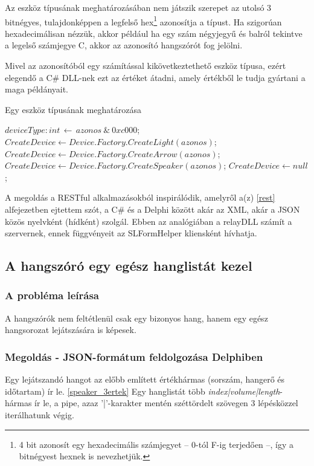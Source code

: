 \documentclass[tocnopagenum]{thesis-ekf}
\begin{document}
	Az eszköz típusának meghatározásában nem játszik szerepet az utolsó 3 bitnégyes, tulajdonképpen a legfelső hex\footnote{4 bit azonosít egy hexadecimális számjegyet -- 0-tól F-ig terjedően --, így a bitnégyest hexnek is nevezhetjük.} azonosítja a típust.
	Ha szigorúan hexadecimálisan nézzük, akkor például ha egy szám négyjegyű és balról tekintve a legelső számjegye C, akkor az azonosító hangszórót fog jelölni.
	
	Mivel az azonosítóból egy számítással kikövetkeztethető eszköz típusa, ezért elegendő a C\# DLL-nek ezt az értéket átadni, amely értékből le tudja gyártani a maga példányait.
	
	\begin{algorithm}
		\caption{Egy eszköz típusának meghatározása}
		\label{algo:createdevice}
		\begin{algorithmic}[0]
			\State $deviceType:int\,\gets\,azonos\ \mathbin{\&}\ 0xc000$; 
				\State $CreateDevice \gets Device.Factory.CreateLight(azonos)$;
				\State $CreateDevice \gets Device.Factory.CreateArrow(azonos)$;
				\State $CreateDevice \gets Device.Factory.CreateSpeaker(azonos)$;
			\Else
				\State $CreateDevice \gets null$;
			\EndIf
		\EndFunction
		\end{algorithmic}
	\end{algorithm}

	A megoldás a RESTful alkalmazásokból inspirálódik, amelyről a(z) \ref{rest} alfejezetben ejtettem szót, a C\# és a Delphi között akár az XML, akár a JSON közös nyelvként (hídként) szolgál. Ebben az analógiában a relayDLL számít a szervernek, ennek függvényeit az SLFormHelper kliensként hívhatja.
	\subsection{A hangszóró egy egész hanglistát kezel}
	\subsubsection{A probléma leírása} A hangszórók nem feltétlenül csak egy bizonyos hang, hanem egy egész hangsorozat lejátszására is képesek. 
	\subsubsection{Megoldás - JSON-formátum feldolgozása Delphiben}
	Egy lejátszandó hangot az előbb említett értékhármas (sorszám, hangerő és időtartam) ír le. \ref{speaker_3ertek}
	Egy hanglistát több \textit{index|volume|length}-hármas ír le, a pipe, azaz '|'-karakter mentén széttördelt szövegen 3 lépésközzel iterálhatunk végig.
	
\end{document}
